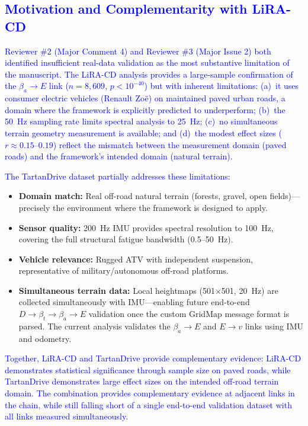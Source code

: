 \documentclass[11pt]{article}
\begin{document}
\textcolor{blue}{\subsection{Motivation and Complementarity with LiRA-CD}}

\textcolor{blue}{Reviewer \#2 (Major Comment 4) and Reviewer \#3 (Major Issue 2) both identified insufficient real-data validation as the most substantive limitation of the manuscript. The LiRA-CD analysis provides a large-sample confirmation of the $\beta_a \rightarrow E$ link ($n = 8{,}609$, $p < 10^{-40}$) but with inherent limitations: (a)~it uses consumer electric vehicles (Renault Zo\"{e}) on maintained paved urban roads, a domain where the framework is explicitly predicted to underperform; (b)~the 50~Hz sampling rate limits spectral analysis to 25~Hz; (c)~no simultaneous terrain geometry measurement is available; and (d)~the modest effect sizes ($r \approx 0.15$--$0.19$) reflect the mismatch between the measurement domain (paved roads) and the framework's intended domain (natural terrain).}

\textcolor{blue}{The TartanDrive dataset partially addresses these limitations:}
{\color{blue}
\begin{itemize}
\item \textbf{Domain match:} Real off-road natural terrain (forests, gravel, open fields)---precisely the environment where the framework is designed to apply.
\item \textbf{Sensor quality:} 200~Hz IMU provides spectral resolution to 100~Hz, covering the full structural fatigue bandwidth (0.5--50~Hz).
\item \textbf{Vehicle relevance:} Rugged ATV with independent suspension, representative of military/autonomous off-road platforms.
\item \textbf{Simultaneous terrain data:} Local heightmaps (501$\times$501, 20~Hz) are collected simultaneously with IMU---enabling future end-to-end $D \rightarrow \beta_t \rightarrow \beta_a \rightarrow E$ validation once the custom GridMap message format is parsed. The current analysis validates the $\beta_a \rightarrow E$ and $E \rightarrow v$ links using IMU and odometry.
\end{itemize}
}

\textcolor{blue}{Together, LiRA-CD and TartanDrive provide complementary evidence: LiRA-CD demonstrates statistical significance through sample size on paved roads, while TartanDrive demonstrates large effect sizes on the intended off-road terrain domain. The combination provides complementary evidence at adjacent links in the chain, while still falling short of a single end-to-end validation dataset with all links measured simultaneously.}
\end{document}
